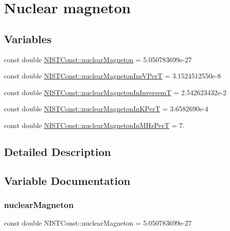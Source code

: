 \hypertarget{group___n_i_s_t_const-_nuclear_magneton}{}\section{Nuclear magneton}
\label{group___n_i_s_t_const-_nuclear_magneton}
\subsection*{Variables}
\begin{DoxyCompactItemize}
\item 
const double \hyperlink{group___n_i_s_t_const-_nuclear_magneton_gacf9b0d2a2517113d30300e4ed7b56cc7}{N\+I\+S\+T\+Const\+::nuclear\+Magneton} = 5.\+050783699e-\/27
\item 
const double \hyperlink{group___n_i_s_t_const-_nuclear_magneton_ga5a31a1865923a1c14cd7f22c8973186e}{N\+I\+S\+T\+Const\+::nuclear\+Magneton\+Ine\+V\+PerT} = 3.\+1524512550e-\/8
\item 
const double \hyperlink{group___n_i_s_t_const-_nuclear_magneton_ga2bb8e56daaa602b5097d38b2d1ca32ad}{N\+I\+S\+T\+Const\+::nuclear\+Magneton\+In\+InversemT} = 2.\+542623432e-\/2
\item 
const double \hyperlink{group___n_i_s_t_const-_nuclear_magneton_gac546d7a48ca06ce3231f7cda738bb4e3}{N\+I\+S\+T\+Const\+::nuclear\+Magneton\+In\+K\+PerT} = 3.\+6582690e-\/4
\item 
const double \hyperlink{group___n_i_s_t_const-_nuclear_magneton_gae1ed12acbc3f50345ed451327b86b5b5}{N\+I\+S\+T\+Const\+::nuclear\+Magneton\+In\+M\+Hz\+PerT} = 7.
\end{DoxyCompactItemize}


\subsection{Detailed Description}


\subsection{Variable Documentation}
\mbox{\label{group___n_i_s_t_const-_nuclear_magneton_gacf9b0d2a2517113d30300e4ed7b56cc7}} 
\subsubsection{\texorpdfstring{nuclear\+Magneton}{nuclearMagneton}}
{\footnotesize\ttfamily const double N\+I\+S\+T\+Const\+::nuclear\+Magneton = 5.\+050783699e-\/27}


